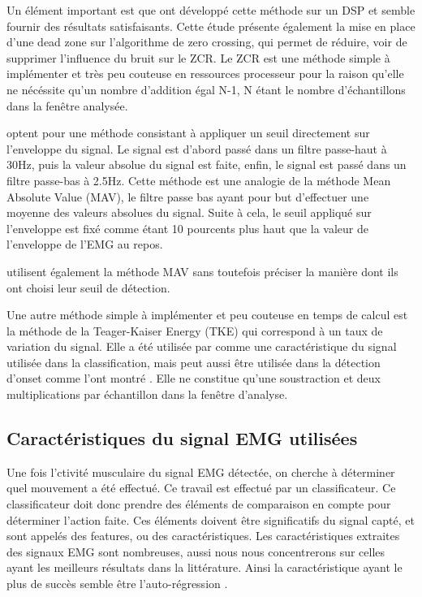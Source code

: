 \documentclass[letterpaper, twoside, 12pt, memoire, creativecommons, hyperref]{thETS}
\begin{document}
Un élément important est que \cite{Chang1996} ont développé cette méthode sur un DSP et semble fournir des résultats satisfaisants. Cette étude présente également la mise en place d’une dead zone sur l’algorithme de zero crossing, qui permet de réduire, voir de supprimer l’influence du bruit sur le ZCR.
Le ZCR est une méthode simple à implémenter et très peu couteuse en ressources processeur pour la raison qu’elle ne nécéssite qu’un nombre d’addition égal N-1, N étant le nombre d’échantillons dans la fenêtre analysée. 

\cite{Peleg2002} optent pour une méthode consistant à appliquer un seuil directement sur l’enveloppe du signal. Le signal est d’abord passé dans un filtre passe-haut à 30Hz, puis la valeur absolue du signal est faite, enfin, le signal est passé dans un filtre passe-bas à 2.5Hz. Cette méthode est une analogie de la méthode Mean Absolute Value (MAV), le filtre passe bas ayant pour but d’effectuer une moyenne des valeurs absolues du signal. Suite à cela, le seuil appliqué sur l’enveloppe est fixé comme étant 10 pourcents plus haut que la valeur de l’enveloppe de l’EMG au repos. 

\cite{Tenore2007} utilisent également la méthode MAV sans toutefois préciser la manière dont ils ont choisi leur seuil de détection. 

Une autre méthode simple à implémenter et peu couteuse en temps de calcul est la méthode de la Teager-Kaiser Energy (TKE) qui correspond à un taux de variation du signal. Elle a été utilisée par \cite{Maheu2011} comme une caractéristique du signal utilisée dans la classification, mais peut aussi être utilisée dans la détection d’onset comme l'ont montré \cite{li2007}. Elle ne constitue qu’une soustraction et deux multiplications par échantillon dans la fenêtre d’analyse. 

\subsection{Caractéristiques du signal EMG utilisées}

Une fois l’ctivité musculaire du signal EMG détectée, on cherche à déterminer quel mouvement a été effectué. Ce travail est effectué par un classificateur. Ce classificateur doit donc prendre des éléments de comparaison en compte pour déterminer l’action faite. Ces éléments doivent être significatifs du signal capté, et sont appelés des features, ou des caractéristiques. 
Les caractéristiques extraites des signaux EMG sont nombreuses, aussi nous nous concentrerons sur celles ayant les meilleurs résultats dans la littérature. Ainsi la caractéristique ayant le plus de succès semble être l’auto-régression \citep{Chang1996, Peleg2002, Maheu2011}.
\end{document}
